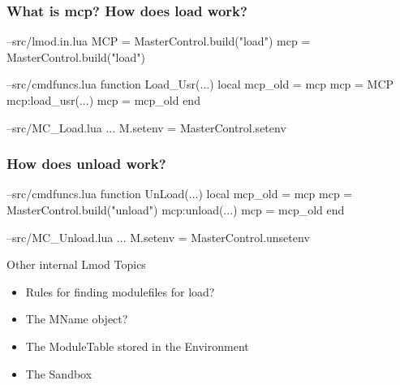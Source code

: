 \documentclass{beamer}
\begin{document}
\begin{frame}[fragile]
  \frametitle{What is mcp? How does load work?}
    {\tiny
\begin{semiverbatim}
--src/lmod.in.lua
   MCP = MasterControl.build("load")
   mcp = MasterControl.build("load")

--src/cmdfuncs.lua
function Load\_Usr(...)
   local mcp\_old = mcp
   mcp = MCP
   mcp:load\_usr(...)
   mcp = mcp\_old
end

--src/MC\_Load.lua
...
M.setenv               = MasterControl.setenv
\end{semiverbatim}
    }
\end{frame}

\begin{frame}[fragile]
  \frametitle{How does unload work?}
    {\tiny
\begin{semiverbatim}
--src/cmdfuncs.lua
function UnLoad(...)
   local mcp\_old = mcp
   mcp = MasterControl.build("unload")
   mcp:unload(...)
   mcp = mcp\_old
end

--src/MC_Unload.lua
...
M.setenv               = MasterControl.unsetenv
\end{semiverbatim}
    }
\end{frame}

\begin{frame}{Other internal Lmod Topics}
  \begin{itemize}
    \item Rules for finding modulefiles for load?
    \item The MName object?
    \item The ModuleTable stored in the Environment
    \item The Sandbox
  \end{itemize}
\end{frame}
\end{document}
